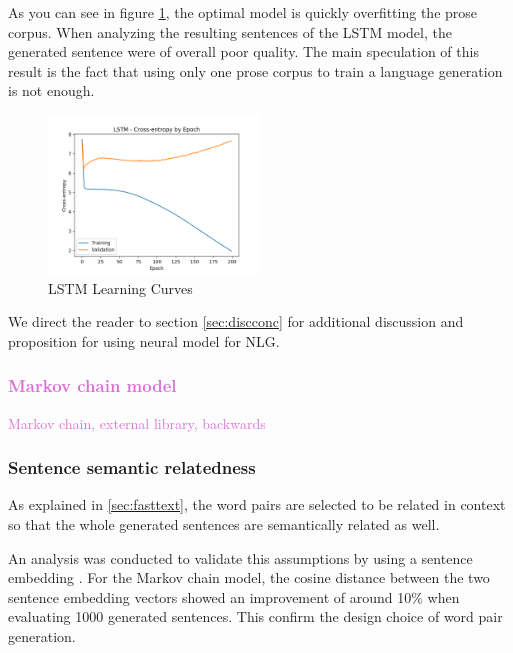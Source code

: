 \documentclass[11pt,a4paper]{article}
\begin{document}
As you can see in figure \ref{fig:LearningCurves}, the optimal model is quickly overfitting the prose corpus. When analyzing the resulting sentences of the LSTM model, the generated sentence were of overall poor quality. The main speculation of this result is the fact that using only one prose corpus to train a language generation is not enough.

\begin{figure}[h]
    \centering
    \includegraphics[width=0.5\textwidth]{LSTM_Loss.png}
    \caption{LSTM Learning Curves}
    \label{fig:LearningCurves}
\end{figure}

We direct the reader to section \ref{sec:discconc} for additional discussion and proposition for using neural model for NLG.

\textcolor{Orchid}{
\subsubsection{Markov chain model}
\label{sec:markov}
Markov chain, external library, backwards
}

\subsubsection{Sentence semantic relatedness}
\label{sec:doc2vec}
As explained in \ref{sec:fasttext}, the word pairs are selected to be related in context so that the whole generated sentences are semantically related as well. 

An analysis was conducted to validate this assumptions by using a sentence embedding \cite{docvec}. For the Markov chain model, the cosine distance between the two sentence embedding vectors showed an improvement of around 10\% when evaluating 1000 generated sentences. This confirm the design choice of word pair generation.


\end{document}
